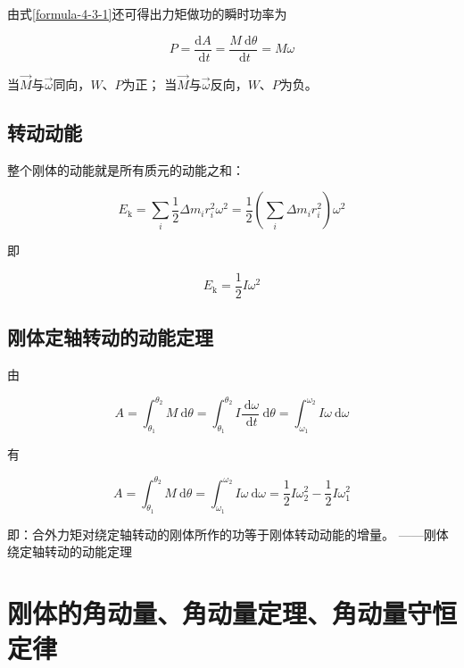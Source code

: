 \documentclass[12pt, a4paper]{article}
\numberwithin{equation}{section}
\begin{document}
    由式\ref{formula-4-3-1}还可得出力矩做功的瞬时功率为

    \begin{equation}
        P=\frac{\mathrm{d} A}{\mathrm{~d} t}=\frac{M \mathrm{~d} \theta}{\mathrm{~d} t}=M \omega
    \end{equation}

    当\(\overrightarrow{M}\)与\(\overrightarrow{\omega}\)同向，\(W\)、\(P\)为正；
    当\(\overrightarrow{M}\)与\(\overrightarrow{\omega}\)反向，\(W\)、\(P\)为负。

\subsection{转动动能}

    整个刚体的动能就是所有质元的动能之和：

    \begin{equation}
        E_{\mathrm{k}}=\sum_i \frac{1}{2} \Delta m_i r_i^2 \omega^2=\frac{1}{2}\left(\sum_i \Delta m_i r_i^2\right) \omega^2
    \end{equation}

    即

    \begin{equation}
        E_{\mathrm{k}}=\frac{1}{2} I \omega^2
    \end{equation}

\subsection{刚体定轴转动的动能定理}

    由

    \begin{equation*}
        A=\int_{\theta_1}^{\theta_2} M \mathrm{~d} \theta=\int_{\theta_1}^{\theta_2} I \frac{\mathrm{~d} \omega}{\mathrm{~d} t} \mathrm{~d} \theta=\int_{\omega_1}^{\omega_2} I \omega \mathrm{~d} \omega
    \end{equation*}

    有

    \begin{equation}
        A=\int_{\theta_1}^{\theta_2} M \mathrm{~d} \theta=\int_{\omega_1}^{\omega_2} I \omega \mathrm{~d} \omega=\frac{1}{2} I \omega_2^2-\frac{1}{2} I \omega_1^2
    \end{equation}

    即：合外力矩对绕定轴转动的刚体所作的功等于刚体转动动能的增量。
    ——刚体绕定轴转动的动能定理

\section{刚体的角动量、角动量定理、角动量守恒定律}
\end{document}
